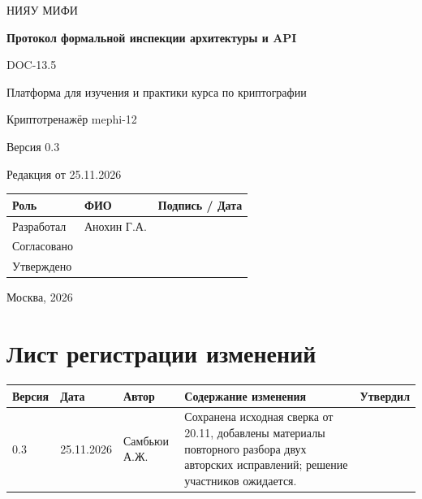 \documentclass[12pt,a4paper]{article}
\begin{document}
\hypersetup{pageanchor=false}
\begin{titlepage}
  \thispagestyle{empty}
  \centering
  {\large НИЯУ МИФИ\par}
  \vspace*{3.5cm}
  {\LARGE\bfseries Протокол формальной инспекции архитектуры и API\par}
  \vspace{0.5cm}
  {\large DOC-13.5\par}
  \vspace{0.6cm}
  {\large Платформа для изучения и практики курса по криптографии\par}
  {\large Криптотренажёр mephi-12\par}
  \vspace{0.7cm}
  {\large Версия 0.3\par}
  {\large Редакция от 25.11.2026\par}
  \vspace{1cm}
  \begin{tabularx}{\textwidth}{@{}p{3.4cm}Xp{4cm}@{}}
    \toprule
    Роль & ФИО & Подпись / Дата \\
    \midrule
    Разработал & Анохин Г.А. & \\
    \addlinespace[6pt]
    Согласовано & & \\
    \addlinespace[6pt]
    Утверждено & & \\
    \bottomrule
  \end{tabularx}
  \vfill
  {\large Москва, 2026\par}
\end{titlepage}
\hypersetup{pageanchor=true}

\section*{Лист регистрации изменений}
\begingroup\small\singlespacing
\noindent
\begin{tabularx}{\textwidth}{@{}p{1.2cm}p{2cm}p{2.5cm}Xp{1.8cm}@{}}
\toprule
Версия & Дата & Автор & Содержание изменения & Утвердил \\
\midrule
0.3 & 25.11.2026 & Самбьюи А.Ж. & Сохранена исходная сверка от 20.11, добавлены материалы повторного разбора двух авторских исправлений; решение участников ожидается. & \\
\bottomrule
\end{tabularx}
\endgroup
\clearpage
\begingroup\small\singlespacing
\tableofcontents
\endgroup
\clearpage
\end{document}
